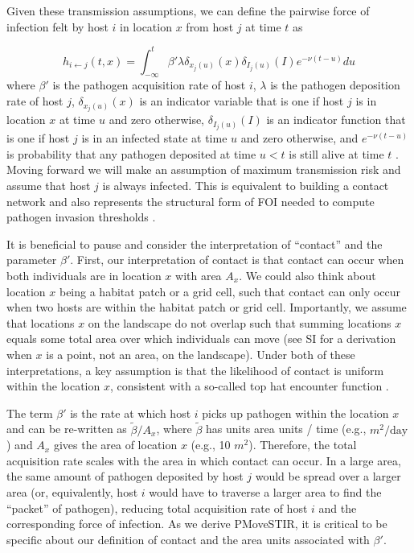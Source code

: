 \documentclass[letterpaper]{article}
\begin{document}
Given these transmission assumptions, we can define the pairwise force of infection felt by host $i$ in location $x$ from host $j$ at time $t$ as \citep{Wilber2022}

\begin{equation}
    h_{i \leftarrow j}(t, x) = \int_{-\infty}^{t} \beta' \lambda \delta_{x_j(u)}(x) \delta_{I_j(u)}(I) e^{-\nu(t - u)} du
    \label{eq:original_foi}
\end{equation}
where $\beta'$ is the pathogen acquisition rate of host $i$, $\lambda$ is the pathogen deposition rate of host $j$, $\delta_{x_j(u)}(x)$ is an indicator variable that is one if host $j$ is in location $x$ at time $u$ and zero otherwise, $\delta_{I_j(u)}(I)$ is an indicator function that is one if host $j$ is in an infected state at time $u$ and zero otherwise, and $e^{-\nu(t - u)}$ is probability that any pathogen deposited at time $u < t$ is still alive at time $t$ \citep[see][for a full derivation]{Wilber2022}.  Moving forward we will make an assumption of maximum transmission risk and assume that host $j$ is always infected. This is equivalent to building a contact network and also represents the structural form of FOI needed to compute pathogen invasion thresholds \citep{Wilber2022}.

It is beneficial to pause and consider the interpretation of ``contact'' and the parameter $\beta'$.  First, our interpretation of contact is that contact can occur when both individuals are in location $x$ with area $A_x$.  We could also think about location $x$ being a habitat patch or a grid cell, such that contact can only occur when two hosts are within the habitat patch or grid cell. Importantly, we assume that locations $x$ on the landscape do not overlap such that summing locations $x$ equals some total area over which individuals can move (see SI for a derivation when $x$ is a point, not an area, on the landscape). Under both of these interpretations, a key assumption is that the likelihood of contact is uniform within the location $x$, consistent with a so-called top hat encounter function \citep{Gurarie2013,Wilber2022}.

The term $\beta'$ is the rate at which host $i$ picks up pathogen within the location $x$ and can be re-written as $\tilde{\beta} / A_x$, where $\tilde{\beta}$ has units area units / time (e.g., $m^2 / \text{day}$) and $A_x$ gives the area of location $x$ (e.g., 10 $m^2$). Therefore, the total acquisition rate scales with the area in which contact can occur. In a large area, the same amount of pathogen deposited by host $j$ would be spread over a larger area (or, equivalently, host $i$ would have to traverse a larger area to find the ``packet'' of pathogen), reducing total acquisition rate of host $i$ and the corresponding force of infection.  As we derive PMoveSTIR, it is critical to be specific about our definition of contact and the area units associated with $\beta'$.  
\end{document}
